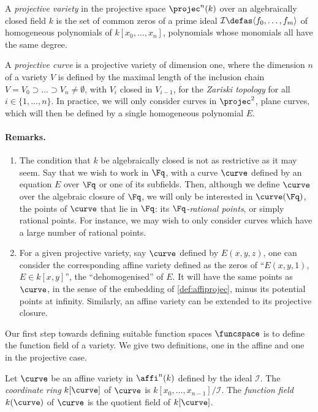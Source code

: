\begin{defi}
A \emph{projective variety} in the projective space $\projec^n(k)$ over an algebraically closed field $k$ is the set of common zeros
of a prime ideal $\mathcal{I} \defas \langle f_0, \ldots, f_m \rangle$ of homogeneous polynomials of $k[x_0,\ldots,x_n]$, \ie polynomials whose
monomials all have the same degree.
\end{defi}

A \emph{projective curve} is a projective variety of dimension one, where the dimension $n$ of a variety $V$ is defined by
the maximal length of the inclusion chain $V = V_0 \supset \ldots \supset V_n \neq \emptyset$, with $V_i$ closed in $V_{i-1}$, for the \emph{Zariski topology}
for all $i \in \{1,\ldots,n\}$. In practice, we will only consider curves in $\projec^2$, \ie plane curves,
which will then be defined by a single homogeneous polynomial $E$.

\paragraph{Remarks.}
\begin{enumerate}
\item The condition that $k$ be algebraically closed is not as restrictive as it may seem. Say that we wish to work in $\Fq$, with a
curve $\curve$ defined by an equation $E$ over $\Fq$ or one of its subfields. Then, 
although we define $\curve$ over the algebraic closure of $\Fq$, we
will only be interested in $\curve(\Fq)$, the points of $\curve$ that lie in $\Fq$: its \emph{$\Fq$-rational points}, or simply rational points.
For instance, we may wish to only consider curves which have a large number of rational points.
\item For a given projective variety, say $\curve$ defined by $E(x,y,z)$, one can consider the corresponding affine variety defined as the zeros of ``$E(x,y,1)$,
$E \in k[x,y]$'', the ``dehomogenised'' of $E$. It will have the same points as $\curve$, in the sense of the embedding of \autoref{def:affiprojec}, minus its potential points at infinity.
Similarly, an affine variety can be extended to its projective closure.
\end{enumerate}

Our first step towards defining suitable function spaces $\funcspace$ is to define the function field of a variety.
We give two definitions, one in the affine and one in the projective case.

\begin{defi}
Let $\curve$ be an affine variety in $\affi^n(k)$ defined by the ideal $\mathcal{I}$. The \emph{coordinate ring} $k[\curve]$ of $\curve$ is $k[x_0, \ldots, x_{n-1}]/\mathcal{I}$.
The \emph{function field} $k(\curve)$ of $\curve$ is the quotient field of $k[\curve]$.
\end{defi}

